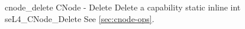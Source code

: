 %
%
%
%

\apidoc
{cnode_delete}
{CNode - Delete}
{Delete a capability}
{static inline int seL4\_CNode\_Delete}
{
}
{\errorenumdesc}
{See \autoref{sec:cnode-ops}.}

